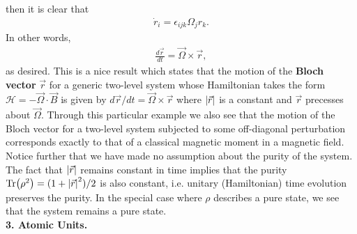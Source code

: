 \documentclass{article}
\theoremstyle{definition}
\newcommand{\ham}{\mathcal{H}}
\newcommand{\f}[2]{\frac{#1}{#2}}
\begin{document}
then it is clear that
\begin{align*}
\dot r_i = \epsilon_{ijk} \Omega_j r_k.
\end{align*}
In other words, 
\begin{align*}
\f{d\vec{r}}{dt} = \vec{\Omega} \times \vec{r},
\end{align*}
as desired. This is a nice result which states that the motion of the \textbf{Bloch vector} $\vec{r}$ for a generic two-level system whose Hamiltonian takes the form $\ham = - \vec{\Omega} \cdot \vec{B}$ is given by $d\vec{r}/dt = \vec{\Omega}\times \vec{r}$ where $\abs{\vec{r}}$ is a constant and $\vec{r}$ precesses about $\vec{\Omega}$. Through this particular example we also see that the motion of the Bloch vector for a two-level system subjected to some off-diagonal perturbation corresponds exactly to that of a classical magnetic moment in a magnetic field. \\


Notice further that we have made no assumption about the purity of the system. The fact that $\abs{\vec{r}}$ remains constant in time implies that the purity $\Tr(\rho^2) = (1 + \abs{\vec{r}}^2)/2$ is also constant, i.e. unitary (Hamiltonian) time evolution preserves the purity. In the special case where $\rho$ describes a pure state, we see  that the system remains a pure state. \\





\noindent \textbf{3. Atomic Units.}
\end{document}
